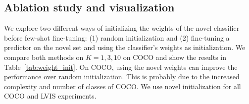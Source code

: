

\subsection{Ablation study and visualization}
\label{sec:vis}

We explore two different ways of initializing the weights of the novel classifier before few-shot fine-tuning: (1) random initialization and (2) fine-tuning a predictor on the novel set and using the classifier's weights as initialization. We compare both methods on $K=1,3,10$ on COCO and show the results in Table~\ref{tab:weight_init}. 
On COCO, using the novel weights can improve the performance over random initialization. This is probably due to the increased complexity and number of classes of COCO. We use novel initialization for all COCO and LVIS experiments.

